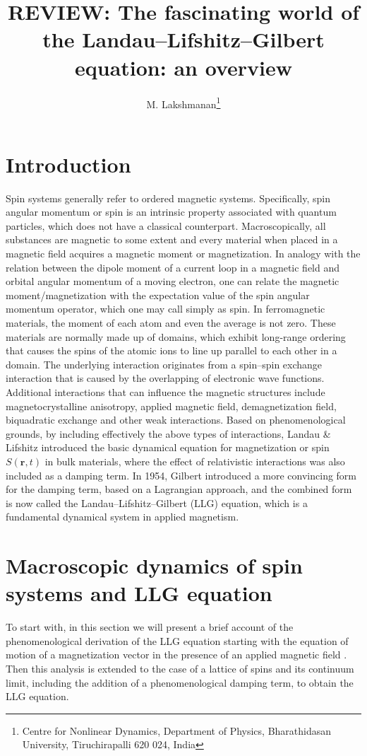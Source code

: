 \documentclass{article}
\title{REVIEW: The fascinating world of the Landau–Lifshitz–Gilbert equation: an overview}
\author{M. Lakshmanan\thanks{Centre for Nonlinear Dynamics, Department of Physics, Bharathidasan University, Tiruchirapalli 620 024, India}}
\date{}
\begin{document}
	
	\maketitle
	
	\section{Introduction}
	Spin systems generally refer to ordered magnetic systems. Specifically, spin angular momentum or spin is an intrinsic property associated with quantum particles, which does not have a classical counterpart. Macroscopically, all substances are magnetic to some extent and every material when placed in a magnetic field acquires a magnetic moment or magnetization. In analogy with the relation between the dipole moment of a current loop in a magnetic field and orbital angular momentum of a moving electron, one can relate the magnetic moment/magnetization with the expectation value of the spin angular momentum operator, which one may call simply as spin. In ferromagnetic materials, the moment of each atom and even the average is not zero. These materials are normally made up of domains, which exhibit long-range ordering that causes the spins of the atomic ions to line up parallel to each other in a domain. The underlying interaction \cite{reference} originates from a spin–spin exchange interaction that is caused by the overlapping of electronic wave functions. Additional interactions that can influence the magnetic structures include magnetocrystalline anisotropy, applied magnetic field, demagnetization field, biquadratic exchange and other weak interactions. Based on phenomenological grounds, by including effectively the above types of interactions, Landau \& Lifshitz \cite{landau} introduced the basic dynamical equation for magnetization or spin $S(\mathbf{r}, t)$ in bulk materials, where the effect of relativistic interactions was also included as a damping term. In 1954, Gilbert \cite{gilbert} introduced a more convincing form for the damping term, based on a Lagrangian approach, and the combined form is now called the Landau–Lifshitz–Gilbert (LLG) equation, which is a fundamental dynamical system in applied magnetism. 
	
	\section{Macroscopic dynamics of spin systems and LLG equation}
	To start with, in this section we will present a brief account of the phenomenological derivation of the LLG equation starting with the equation of motion of a magnetization vector in the presence of an applied magnetic field \cite{landau}. Then this analysis is extended to the case of a lattice of spins and its continuum limit, including the addition of a phenomenological damping term, to obtain the LLG equation.
	
\end{document}
